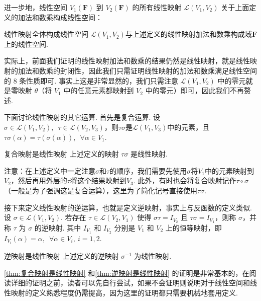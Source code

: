 进一步地，线性空间 $V_1(\mathbf{F})$ 到 $V_2(\mathbf{F})$ 的所有线性映射 $\mathcal{L}(V_1,V_2)$ 关于上面定义的加法和数乘构成线性空间：

\begin{theorem}{}{线性映射全体构成线性空间}
    $\mathcal{L}(V_1,V_2)$与上述定义的线性映射加法和数乘构成域$\mathbf{F}$上的线性空间.
\end{theorem}

实际上，前面我们证明的线性映射加法和数乘的结果仍然是线性映射，就是线性映射的加法和数乘的封闭性，因此我们只需证明线性映射的加法和数乘满足线性空间的 8 条性质即可. 事实上这是非常显然的，我们只需注意 $\mathcal{L}(V_1,V_2)$ 中的零元就是零映射 $\theta$（将 $V_1$ 中的任意元素都映射到 $V_2$ 中的零元）即可，因此我们不再赘述.

下面讨论线性映射的其它运算. 首先是复合运算. 设$\sigma \in \mathcal{L}(V_1,V_2),\enspace\tau \in \mathcal{L}(V_2,V_3)$，则$\tau\sigma$是$\mathcal{L}(V_1,V_3)$中的元素，且$\tau\sigma(\alpha)=\tau(\sigma(\alpha)),\enspace\forall \alpha \in V_1$.

\begin{theorem}{}{复合映射是线性映射}
    上述定义的映射 $\tau\sigma$ 是线性映射.
\end{theorem}

注意：在上述定义中一定注意$\sigma$和$\tau$的顺序，我们需要先使用$\sigma$将$V_1$中的元素映射到$V_2$，然后再用外层的$\tau$将这个结果映射到$V_3$. 此外，有时也会将复合映射记作$\tau \circ \sigma$（一般是为了强调这是复合运算），这里为了简化记号直接使用$\tau\sigma$.

接下来定义线性映射的逆运算，也就是定义逆映射，事实上与反函数的定义类似. 设 $\sigma \in \mathcal{L}(V_1,V_2)$. 若存在 $\tau \in \mathcal{L}(V_2,V_1)$ 使得 $\sigma \tau = I_{V_2}$ 且 $\tau \sigma = I_{V_1}$，则称 $\sigma$，并称 $\tau$ 为 $\sigma$ 的逆映射. 其中 $I_{V_1}$ 和 $I_{V_2}$ 分别是 $V_1$ 和 $V_2$ 上的恒等映射，即 $I_{V_i}(\alpha)=\alpha,\enspace \forall \alpha \in V_i,\ i = 1, 2$.

\begin{theorem}{}{逆映射是线性映射}
    上述定义的逆映射 $\sigma^{-1}$ 为线性映射.
\end{theorem}

\autoref{thm:复合映射是线性映射} 和\autoref{thm:逆映射是线性映射} 的证明是非常基本的，在阅读详细的证明之前，读者可以先自行尝试，如果不会证明则说明对于线性空间和线性映射的定义熟悉程度仍需提高，因为这里的证明都只需要机械地套用定义.

